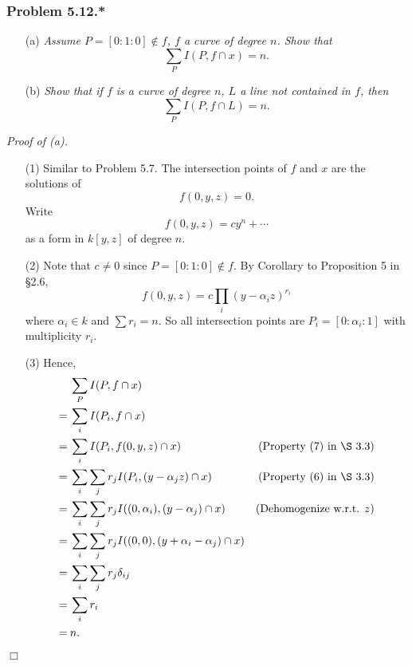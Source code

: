 \documentclass{article}
\begin{document}



\subsubsection*{Problem 5.12.*}
\begin{enumerate}
\item[(a)]
  \emph{Assume $P = [0:1:0] \not\in f$, $f$ a curve of degree $n$.
  Show that}
  \[
    \sum_{P} I(P, f \cap x) = n.
  \]

\item[(b)]
  \emph{Show that if $f$ is a curve of degree $n$,
  $L$ a line not contained in $f$, then}
  \[
    \sum_{P} I(P, f \cap L) = n.
  \]
\end{enumerate}



\emph{Proof of (a).}
\begin{enumerate}
\item[(1)]
  Similar to Problem 5.7.
  The intersection points of $f$ and $x$ are the solutions of
  \[
    f(0,y,z) = 0.
  \]
  Write
  \[
    f(0,y,z) = c y^n + \cdots
  \]
  as a form in $k[y,z]$ of degree $n$.

\item[(2)]
  Note that $c \neq 0$ since $P = [0:1:0] \not\in f$.
  By Corollary to Proposition 5 in \S 2.6,
  \[
    f(0,y,z) = c \prod_{i}(y - \alpha_i z)^{r_i}
  \]
  where $\alpha_i \in k$ and $\sum r_i = n$.
  So all intersection points are $P_i = [0:\alpha_i:1]$
  with multiplicity $r_i$.

\item[(3)]
  Hence,
  \begin{align*}
    & \: \sum_{P} I(P, f \cap x) \\
    =& \: \sum_{i} I(P_i, f \cap x) \\
    =& \: \sum_{i} I(P_i, f(0,y,z) \cap x)
      &(\text{Property (7) in \S 3.3}) \\
    =& \: \sum_{i} \sum_{j} r_j I(P_i, (y - \alpha_j z) \cap x)
      &(\text{Property (6) in \S 3.3}) \\
    =& \: \sum_{i} \sum_{j} r_j I((0,\alpha_i), (y - \alpha_j) \cap x)
      &(\text{Dehomogenize w.r.t. $z$}) \\
    =& \: \sum_{i} \sum_{j} r_j I((0,0), (y + \alpha_i - \alpha_j) \cap x) \\
    =& \: \sum_{i} \sum_{j} r_j \delta_{ij} \\
    =& \: \sum_{i} r_i \\
    =& \: n.
  \end{align*}
\end{enumerate}
$\Box$ \\
\end{document}

